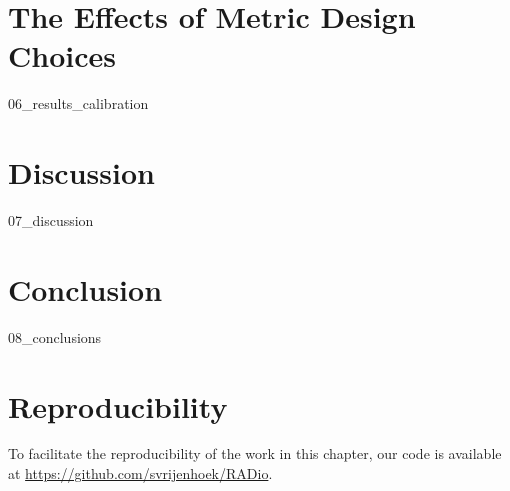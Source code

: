 \section{The Effects of Metric Design Choices}
{06_results_calibration}

\section{Discussion}
\label{sec:discussion}
{07_discussion}

\section{Conclusion}
\label{sec:conclusions}
{08_conclusions}



\section*{Reproducibility}
To facilitate the reproducibility of the work in this chapter, our code is available at \url{https://github.com/svrijenhoek/RADio}.

